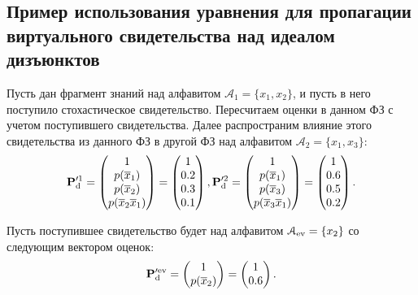 \subsection*{Пример использования уравнения для пропагации виртуального свидетельства над идеалом дизъюнктов}
Пусть дан фрагмент знаний над алфавитом $\mathcal{A}_1 = \{x_1, x_2\}$, и пусть в него поступило стохастическое свидетельство. Пересчитаем оценки в данном ФЗ с учетом поступившего свидетельства. Далее распространим влияние этого свидетельства из данного ФЗ в другой ФЗ над алфавитом  $\mathcal{A}_2 = \{x_1, x_3\}$:
\begin{equation*}
\mathbf{P}_\mathrm{d}^{\prime 1} =  \begin{pmatrix}
1 \\ p(\overline {x}_1) \\ p(\overline {x}_2) \\ p(\overline {x}_2\overline {x}_1)
\end{pmatrix} = \begin{pmatrix}
1 \\ 0.2\\ 0.3\\ 0.1
\end{pmatrix},
\mathbf{P}_\mathrm{d}^{\prime 2} =  \begin{pmatrix}
1 \\ p(\overline{x}_1) \\ p(\overline{x}_3) \\ p(\overline{x}_3\overline{x}_1)
\end{pmatrix} = \begin{pmatrix}
1 \\ 0.6\\ 0.5\\ 0.2 
\end{pmatrix}.
\end{equation*}

Пусть поступившее свидетельство будет над алфавитом
$\mathcal{A}_{\mathrm{ev}} = \{x_2\}$ со следующим вектором оценок:
\begin{equation*}
\mathbf{P}_\mathrm{d}^{\prime \mathrm{ev}} = \begin{pmatrix}  1 \\ p(\overline{x}_2)	\end{pmatrix} = \begin{pmatrix}
1 \\ 0.6
\end{pmatrix}.
\end{equation*}

